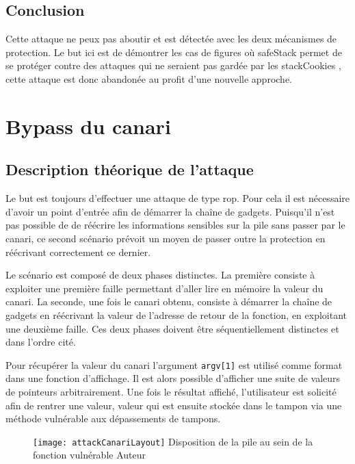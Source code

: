 \subsection{Conclusion}

Cette attaque ne peux pas aboutir et est détectée avec les deux mécanismes de protection. Le but ici est de démontrer les cas de figures où \og \gls{safeStack} \fg permet de se protéger contre des attaques qui ne seraient pas gardée par les \og \gls{stackCookies} \fg, cette attaque est donc abandonée au profit d'une nouvelle approche.


\section{Bypass du canari}

\subsection{Description théorique de l'attaque}

Le but est toujours d'effectuer une attaque de type \gls{rop}. Pour cela il est
nécessaire d'avoir un point d'entrée afin de démarrer la chaîne de gadgets.
Puisqu'il n'est pas possible de de réécrire les informations sensibles sur la pile
sans passer par le canari, ce second scénario prévoit un moyen de passer outre la
protection en réécrivant correctement ce dernier.

Le scénario est composé de deux phases distinctes. La première consiste à exploiter
une première faille permettant d'aller lire en mémoire la valeur du canari. La
seconde, une fois le canari obtenu, consiste à démarrer la chaîne de gadgets en
réécrivant la valeur de l'adresse de retour de la fonction, en exploitant une deuxième
faille. Ces deux phases doivent être séquentiellement distinctes et dans l'ordre cité.

Pour récupérer la valeur du canari l'argument \texttt{argv[1]} est utilisé comme
format dans une fonction d'affichage. Il est alors possible d'afficher une suite de
valeurs de pointeurs arbitrairement. Une fois le résultat affiché, l'utilisateur est
solicité afin de rentrer une valeur, valeur qui est ensuite stockée dans le tampon via
une méthode vulnérable aux dépassements de tampons.

\begin{figure}[H]
	\centering
	\texttt{[image: attackCanariLayout]}
	{Disposition de la pile au sein de la fonction vulnérable}
	{Auteur}
	\label{fig:attackCanariLayout}
\end{figure}


